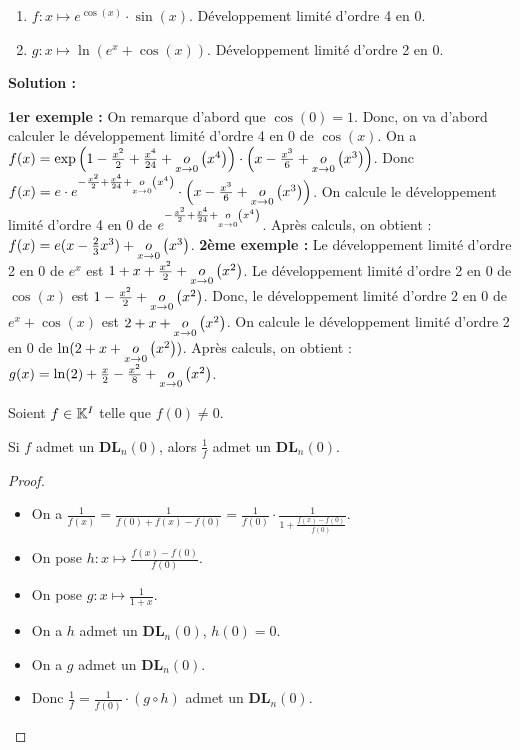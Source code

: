 \documentclass[12pt, a4paper]{report}
\begin{document}
\begin{example}
    \begin{enumerate}
        \item $f:x\mapsto e^{\cos(x)}\cdot \sin(x)$. Développement limité d'ordre 4 en 0.
        \item $g:x\mapsto \ln(e^x + \cos(x))$. Développement limité d'ordre 2 en 0.
    \end{enumerate}

    \textbf{Solution :}

    \begin{outline}
        \1 \textbf{1er exemple :}
        \2 On remarque d'abord que $\cos(0)=1$. Donc, on va d'abord calculer le développement limité d'ordre 4 en 0 de $\cos(x)$.
        \2 On a $f(x)=\mathrm{exp}\left(1-\frac{x^2}2 + \frac{x^4}{24} + \underset{x\to0}{o}\left(x^4\right)\right) \cdot \left(x - \frac{x^3}{6} + \underset{x\to0}{o}\left(x^3\right)\right)$.
        \2 Donc $f(x) = e\cdot e^{-\frac{x^2}2 + \frac{x^4}{24} + \underset{x\to0}{o}\left(x^4\right)} \cdot \left(x - \frac{x^3}{6} + \underset{x\to0}{o}\left(x^3\right)\right)$.
        \2 On calcule le développement limité d'ordre 4 en 0 de $e^{-\frac{x^2}2 + \frac{x^4}{24} + \underset{x\to0}{o}\left(x^4\right)}$.
        \2 Après calculs, on obtient : $f(x)=e(x-\frac23x^3)+\underset{x\to0}{o}\left(x^3\right)$.
        \1 \textbf{2ème exemple :}
        \2 Le développement limité d'ordre 2 en 0 de $e^x$ est $1 + x + \frac{x^2}{2} + \underset{x\to0}{o}\left(x^2\right)$.
        \2 Le développement limité d'ordre 2 en 0 de $\cos(x)$ est $1 - \frac{x^2}{2} + \underset{x\to0}{o}\left(x^2\right)$.
        \2 Donc, le développement limité d'ordre 2 en 0 de $e^x + \cos(x)$ est $2 + x + \underset{x\to0}{o}\left(x^2\right)$.
        \2 On calcule le développement limité d'ordre 2 en 0 de $\ln(2 + x + \underset{x\to0}{o}\left(x^2\right))$.
        \2 Après calculs, on obtient : $g(x) = \ln(2) + \frac{x}{2} - \frac{x^2}{8} + \underset{x\to0}{o}\left(x^2\right)$.
    \end{outline}
\end{example}

\begin{property}
    Soient $f\in \mathbb{K}^I$ telle que $f(0) \ne 0$.

    Si $f$ admet un $\mathbf{DL}_n(0)$, alors $\frac1f$ admet un $\mathbf{DL}_n(0)$.
\end{property}

\begin{proof}
    \begin{itemize}
        \item On a $\frac{1}{f(x)} = \frac{1}{f(0) + f(x) - f(0)} = \frac{1}{f(0)} \cdot \frac{1}{1 + \frac{f(x) - f(0)}{f(0)}}$.

        \item On pose $h:x\mapsto \frac{f(x) - f(0)}{f(0)}$.
        \item On pose $g:x\mapsto \frac{1}{1+x}$.
        
        \item On a $h$ admet un $\mathbf{DL}_n(0)$, $h(0)=0$.
        \item On a $g$ admet un $\mathbf{DL}_n(0)$.
        \item Donc $\frac1f=\frac1{f(0)}\cdot (g\circ h)$ admet un $\mathbf{DL}_n(0)$.
    \end{itemize}
\end{proof}
\end{document}
